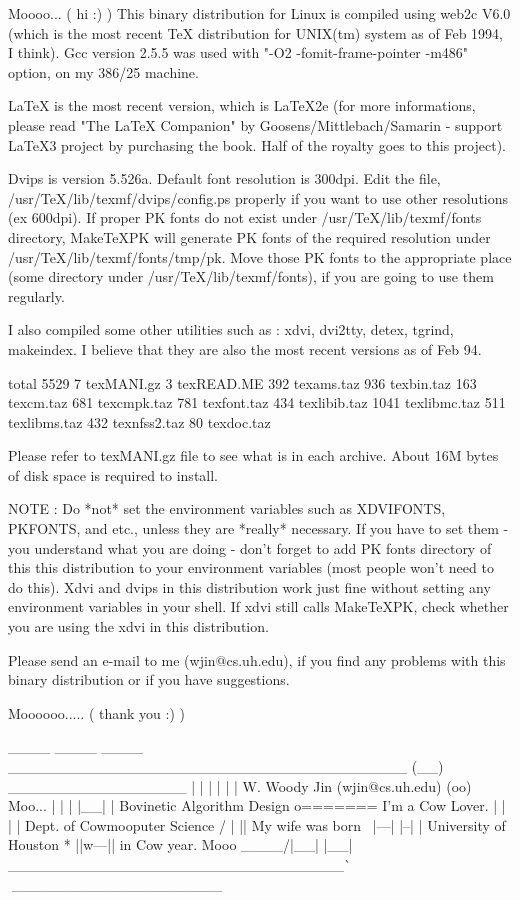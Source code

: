 
Moooo... ( hi :) )
This binary distribution for Linux is compiled using web2c V6.0 (which is 
the most recent TeX distribution for UNIX(tm) system as of Feb 1994, I think).
Gcc version 2.5.5 was used with "-O2 -fomit-frame-pointer -m486" option,
on my 386/25 machine.

LaTeX is the most recent version, which is LaTeX2e (for more informations,
please read  "The LaTeX Companion" by Goosens/Mittlebach/Samarin - support 
LaTeX3 project by purchasing the book. Half of the royalty goes to this 
project).

Dvips is version 5.526a.  Default font resolution is 300dpi.
Edit the file, /usr/TeX/lib/texmf/dvips/config.ps properly if you
want to use other resolutions (ex 600dpi).
If proper PK fonts do not exist under /usr/TeX/lib/texmf/fonts directory,
MakeTeXPK will generate PK fonts of the required resolution under 
/usr/TeX/lib/texmf/fonts/tmp/pk.  Move those PK fonts to the appropriate place
(some directory under /usr/TeX/lib/texmf/fonts), if you are going to use 
them regularly.

I also compiled some other utilities such as : 
                      xdvi, dvi2tty, detex, tgrind, makeindex.
I believe that they are also the most recent versions as of Feb 94.

total 5529
   7 texMANI.gz
   3 texREAD.ME
 392 texams.taz
 936 texbin.taz
 163 texcm.taz
 681 texcmpk.taz
 781 texfont.taz
 434 texlibib.taz
1041 texlibmc.taz
 511 texlibms.taz
 432 texnfss2.taz
  80 texdoc.taz

Please refer to texMANI.gz file to see what is in each archive.
About 16M bytes of disk space is required to install.

NOTE : Do *not* set the environment variables such as XDVIFONTS,
       PKFONTS, and etc., unless they are *really* necessary.
       If you have to set them - you understand what you are doing -
       don't forget to add PK fonts directory of this this distribution
       to your environment variables (most people won't need to do this).
       Xdvi and dvips in this distribution work just fine without
       setting any environment variables in your shell.
       If xdvi still calls MakeTeXPK, check whether you are using the
       xdvi in this distribution.

Please send an e-mail to me (wjin@cs.uh.edu), if you find any problems
with this binary distribution or if you have suggestions.

Moooooo..... ( thank you  :) )

____   ____  ____ ______________________________________ (__) _________________
|  |   |  |  |  |  W. Woody Jin (wjin@cs.uh.edu)         (oo)      Moo...
|  |   |  |__|  |  Bovinetic Algorithm Design     o=======\/  I'm  a Cow Lover.
|  |   |        |  Dept. of Cowmooputer Science / |     ||   My wife  was born
\  |---|  |--|  |  University of Houston       *  ||w---||   in Cow year.  Mooo
 \____/|__|  |__| ________________________________^^    ^^_____________________
